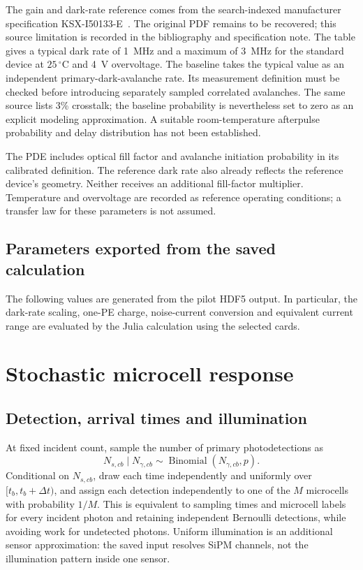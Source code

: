 \documentclass[11pt]{article}
\providecommand{\SiPMGeneratedParameters}{}
\begin{document}
The gain and dark-rate reference comes from the search-indexed manufacturer
specification KSX-I50133-E~\cite{Hamamatsu2017VUV4Indexed}. The original PDF
remains to be recovered; this source limitation is recorded in the
bibliography and specification note. The table gives a typical dark rate of
1~MHz and a maximum of 3~MHz for the standard device at $25\,^{\circ}$C and
4~V overvoltage. The baseline takes the typical value as an independent
primary-dark-avalanche rate. Its measurement definition must be checked
before introducing separately sampled correlated avalanches. The same source
lists 3\% crosstalk; the baseline probability is nevertheless set to zero as an
explicit modeling approximation. A suitable room-temperature afterpulse
probability and delay distribution has not been established.

The PDE includes optical fill factor and avalanche initiation probability in
its calibrated definition. The reference dark rate also already reflects the
reference device's geometry. Neither receives an additional fill-factor
multiplier. Temperature and overvoltage are recorded as reference operating
conditions; a transfer law for these parameters is not assumed.

\subsection{Parameters exported from the saved calculation}
The following values are generated from the pilot HDF5 output. In particular,
the dark-rate scaling, one-PE charge, noise-current conversion and equivalent
current range are evaluated by the Julia calculation using the selected cards.
\begin{center}\small
\SiPMGeneratedParameters
\end{center}

\section{Stochastic microcell response}
\subsection{Detection, arrival times and illumination}
At fixed incident count, sample the number of primary photodetections as
\begin{equation}
 N_{s,cb}\mid N_{\gamma,cb}\sim
 \operatorname{Binomial}(N_{\gamma,cb},p).
 \label{eq:detection}
\end{equation}
Conditional on $N_{s,cb}$, draw each time independently and uniformly over
$[t_b,t_b+\Delta t)$, and assign each detection independently to one of the
$M$ microcells with probability $1/M$. This is equivalent to sampling times
and microcell labels for every incident photon and retaining independent
Bernoulli detections, while avoiding work for undetected photons. Uniform
illumination is an additional sensor approximation: the saved input resolves
SiPM channels, not the illumination pattern inside one sensor.
\end{document}

